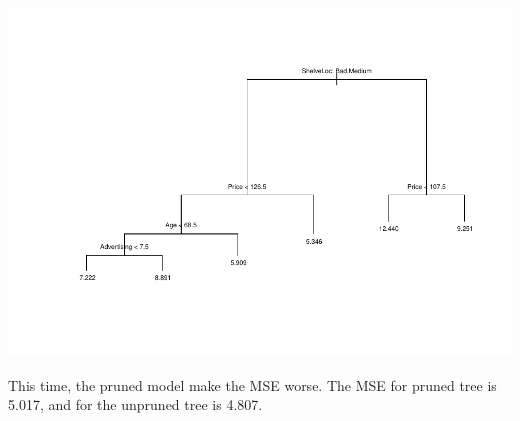 \documentclass[
]{article}
\newenvironment{Shaded}{\begin{snugshade}}{\end{snugshade}}
\newcommand{\AttributeTok}[1]{\textcolor[rgb]{0.77,0.63,0.00}{#1}}
\newcommand{\DecValTok}[1]{\textcolor[rgb]{0.00,0.00,0.81}{#1}}
\newcommand{\FloatTok}[1]{\textcolor[rgb]{0.00,0.00,0.81}{#1}}
\newcommand{\FunctionTok}[1]{\textcolor[rgb]{0.00,0.00,0.00}{#1}}
\newcommand{\NormalTok}[1]{#1}
\newcommand{\OtherTok}[1]{\textcolor[rgb]{0.56,0.35,0.01}{#1}}
\newcommand{\SpecialCharTok}[1]{\textcolor[rgb]{0.00,0.00,0.00}{#1}}
\begin{document}
\includegraphics{Homework_13_Pan_files/figure-latex/unnamed-chunk-6-1.pdf}

\begin{Shaded}
\end{Shaded}

This time, the pruned model make the MSE worse. The MSE for pruned tree
is 5.017, and for the unpruned tree is 4.807.
\end{document}
